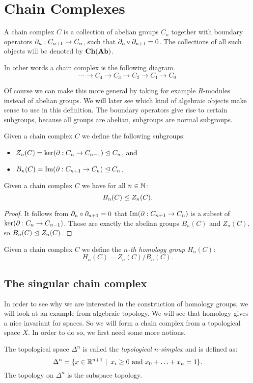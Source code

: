 \section{Chain Complexes}
\label{sec:Chain Complexes}
\begin{definition}
	A chain complex $C$ is a collection of abelian groups $C_n$ together with boundary operators $\partial_n: C_{n+1} \to C_n$, such that $\partial_n \circ \partial_{n+1} = 0$. The collections of all such objects will be denoted by $\mathbf{Ch}(\mathbf{Ab})$.
\end{definition}

In other words a chain complex is the following diagram.
$$ \cdots \to C_4 \to C_3 \to C_2 \to C_1 \to C_0 $$

Of course we can make this more general by taking for example $R$-modules instead of abelian groups. We will later see which kind of algebraic objects make sense to use in this definition. The boundary operators give rise to certain subgroups, because all groups are abelian, subgroups are normal subgroups.

\begin{definition}
	Given a chain complex $C$ we define the following subgroups:
	\begin{itemize}
		\item $Z_n(C) = \ker(\partial: C_n \to C_{n-1}) \trianglelefteq C_n$, and
		\item $B_n(C) = \operatorname{Im}(\partial: C_{n+1} \to C_n) \trianglelefteq C_n$.
	\end{itemize}
\end{definition}
\begin{lemma}
	Given a chain complex $C$ we have for all $n \in \mathbb{N}$:
	$$ B_n(C) \trianglelefteq Z_n(C).$$
\end{lemma}
\begin{proof}
	It follows from $\partial_n \circ \partial_{n+1} = 0$ that $\operatorname{Im}(\partial: C_{n+1} \to C_n)$ is a subset of $\ker(\partial: C_n \to C_{n-1})$. Those are exactly the abelian groups $B_n(C)$ and $Z_n(C)$, so $ B_n(C) \trianglelefteq Z_n(C) $.
\end{proof}
\begin{definition}
	Given a chain complex $C$ we define the \emph{$n$-th homology group} $H_n(C)$:
	$$ H_n(C) = Z_n(C) / B_n(C).$$
\end{definition}

\subsection{The singular chain complex}
In order to see why we are interested in the construction of homology groups, we will look at an example from algebraic topology. We will see that homology gives a nice invariant for spaces. So we will form a chain complex from a topological space $X$. In order to do so, we first need some more notions.
\begin{definition}
	The topological space $\Delta^n$ is called the \emph{topological $n$-simplex} and is defined as:
	$$ \Delta^n = \{x \in \mathbb{R}^{n+1} \,\mid\, x_i \geq 0 \text{ and } x_0 + \ldots + x_n = 1 \}.$$
	The topology on $\Delta^n$ is the subspace topology.
\end{definition}


